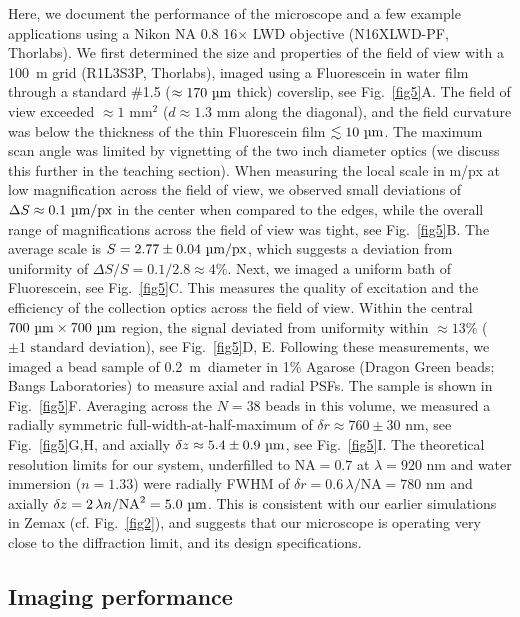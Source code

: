 \documentclass[10pt,letterpaper]{article}
\newcommand{\microns}{~\textmu m~} %
\begin{document}
Here, we document the performance of the microscope and a few example applications using a Nikon NA 0.8 16$\times$ LWD objective (N16XLWD-PF, Thorlabs). We first determined the size and properties of the field of view with a 100~\textmu m grid (R1L3S3P, Thorlabs), imaged using a Fluorescein in water film through a standard \#1.5 ($\approx170\text{ \textmu m}$ thick) coverslip, see Fig.~\ref{fig5}A. The field of view exceeded $\approx 1\text{ mm}^2$ ($d\approx1.3\text{ mm}$ along the diagonal), and the field curvature was below the thickness of the thin Fluorescein film $\lesssim 10\text{ \textmu m}$. The maximum scan angle was limited by vignetting of the two inch diameter optics (we discuss this further in the teaching section). When measuring the local scale in \textmu m/px at low magnification across the field of view, we observed small deviations of $\Delta S \approx 0.1\text{ \textmu m/px}$ in the center when compared to the edges, while the overall range of magnifications across the field of view was tight, see Fig.~\ref{fig5}B. The average scale is $S=2.77\pm0.04\text{ \textmu m/px}$, which suggests a deviation from uniformity of $\Delta S/S = 0.1/2.8 \approx 4\%$. Next, we imaged a uniform bath of Fluorescein, see Fig.~\ref{fig5}C. This measures the quality of excitation and the efficiency of the collection optics across the field of view. Within the central $700\text{ \textmu m} \times 700\text{ \textmu m}$ region, the signal deviated from uniformity within $\approx 13\%$ ($\pm 1 \text{ standard deviation}$), see Fig.~\ref{fig5}D, E. Following these measurements, we imaged a bead sample of 0.2\microns diameter in 1\% Agarose (Dragon Green beads; Bangs Laboratories) to measure axial and radial PSFs. The sample is shown in Fig.~\ref{fig5}F. Averaging across the $N=38$ beads in this volume, we measured a radially symmetric full-width-at-half-maximum of $\delta r\approx760\pm30\text{ nm}$, see Fig.~\ref{fig5}G,H, and axially $\delta z \approx 5.4\pm0.9\text{ \textmu m}$, see Fig.~\ref{fig5}I. The theoretical resolution limits\cite{Tsai2002} for our system, underfilled to $\text{NA}=0.7$ at $\lambda=920\text{ nm}$ and water immersion ($n=1.33$) were radially FWHM of $\delta r=0.6\,\lambda/\text{NA}=780\text{ nm}$ and axially $\delta z = 2\,\lambda n/\text{NA}^2=5.0\text{ \textmu m}$. This is consistent with our earlier simulations in Zemax (cf. Fig.~\ref{fig2}), and suggests that our microscope is operating very close to the diffraction limit, and its design specifications.

\subsection*{Imaging performance}
\end{document}
